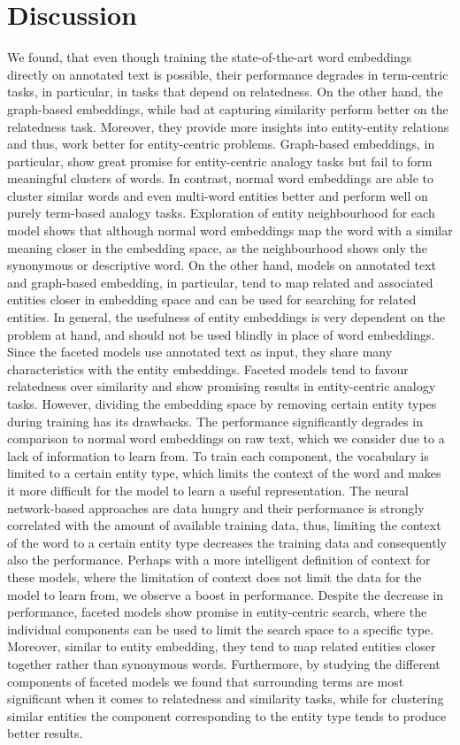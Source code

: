 \section{Discussion}
We found, that even though training the state-of-the-art word embeddings directly on annotated text is possible, their performance degrades in term-centric tasks, in particular, in tasks that depend on relatedness. On the other hand, the graph-based embeddings, while bad at capturing similarity perform better on the relatedness task. Moreover, they provide more insights into entity-entity relations and thus, work better for entity-centric problems. Graph-based embeddings, in particular, show great promise for entity-centric analogy tasks but fail to form meaningful clusters of words. In contrast, normal word embeddings are able to cluster similar words and even multi-word entities better and perform well on purely term-based analogy tasks. Exploration of entity neighbourhood for each model shows that although normal word embeddings map the word with a similar meaning closer in the embedding space, as the neighbourhood shows only the synonymous or descriptive word. On the other hand, models on annotated text and graph-based embedding, in particular, tend to map related and associated entities closer in embedding space and can be used for searching for related entities. In general, the usefulness of entity embeddings is very dependent on the problem at hand, and should not be used blindly in place of word embeddings.
\\
Since the faceted models use annotated text as input, they share many characteristics with the entity embeddings. Faceted models tend to favour relatedness over similarity and show promising results in entity-centric analogy tasks. However, dividing the embedding space by removing certain entity types during training has its drawbacks. The performance significantly degrades in comparison to normal word embeddings on raw text, which we consider due to a lack of information to learn from. To train each component, the vocabulary is limited to a certain entity type, which limits the context of the word and makes it more difficult for the model to learn a useful representation. The neural network-based approaches are data hungry and their performance is strongly correlated with the amount of available training data, thus, limiting the context of the word to a certain entity type decreases the training data and consequently also the performance. Perhaps with a more intelligent definition of context for these models, where the limitation of context does not limit the data for the model to learn from, we observe a boost in performance. Despite the decrease in performance, faceted models show promise in entity-centric search, where the individual components can be used to limit the search space to a specific type. Moreover, similar to entity embedding, they tend to map related entities closer together rather than synonymous words. Furthermore, by studying the different components of faceted models we found that surrounding terms are most significant when it comes to relatedness and similarity tasks, while for clustering similar entities the component corresponding to the entity type tends to produce better results.

